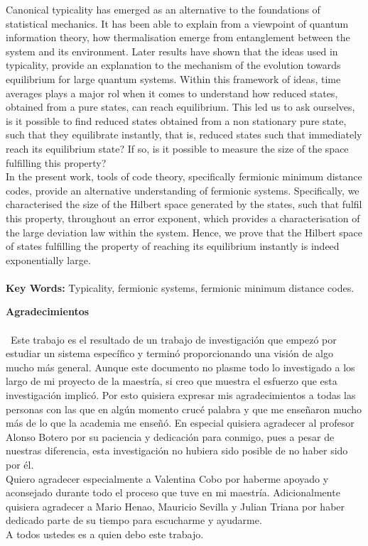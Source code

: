 Canonical typicality has emerged as an alternative to the foundations of statistical mechanics. It has been able to explain from a viewpoint of quantum information theory, how thermalisation emerge from entanglement between the system and its environment. Later results have shown that the ideas used in typicality, provide an explanation to the mechanism of the evolution towards equilibrium for large quantum systems. Within this framework of ideas, time averages plays a major rol when it comes to understand how reduced states, obtained from a pure states, can reach equilibrium. This led us to ask ourselves, is it possible to find reduced states obtained from a non stationary pure state, such that they equilibrate instantly, that is, reduced states such that immediately reach its equilibrium state? If so, is it possible to measure the size of the space fulfilling this property? \\
\indent In the present work, tools of code theory, specifically fermionic minimum distance codes, provide an alternative understanding of fermionic systems. Specifically, we characterised the size of the Hilbert space generated by the states, such that fulfil this property, throughout an error exponent, which provides a characterisation of the large deviation law within the system. Hence, we prove that the Hilbert space of states fulfilling the property of reaching its equilibrium instantly is indeed exponentially large.\\\\
\textbf{\small Key Words: }Typicality, fermionic systems, fermionic minimum distance codes.
\newpage{}

\textbf{\LARGE Agradecimientos}\\\\
\
Este trabajo es el resultado de un trabajo de investigación que empezó por estudiar un sistema específico y terminó proporcionando una visión de algo mucho más general. Aunque este documento no plasme todo lo investigado a los largo de mi proyecto de la maestría, si creo que muestra el esfuerzo que esta investigación implicó. Por esto quisiera expresar mis agradecimientos a todas las personas con las que en algún momento crucé palabra y que me enseñaron mucho más de lo que la academia me enseñó. En especial quisiera agradecer al profesor Alonso Botero por su paciencia y dedicación para conmigo, pues a pesar de nuestras diferencia, esta investigación no hubiera sido posible de no haber sido por él.\\
\indent Quiero  agradecer especialmente a Valentina Cobo por haberme apoyado y aconsejado durante todo el proceso que tuve en mi maestría. Adicionalmente quisiera agradecer a Mario Henao, Mauricio Sevilla y Julian Triana por haber dedicado parte de su tiempo para escucharme y ayudarme.\\
\indent A todos ustedes es a quien debo este trabajo.


